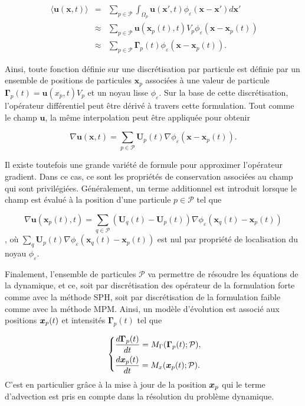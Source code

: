 \begin{eqnarray*}~\label{eq:part_approx}
    \langle \bm{u}(\bm{x}, t) \rangle &=& \sum_{p \in \mathcal P} \int_{\Omega_p} \bm{u}(\bm{x}', t) \phi_\varepsilon(\bm{x}-\bm{x}') d\bm{x}' \\
    &\approx& \sum_{p \in \mathcal P} \bm{u}(\bm{x}_p(t), t) V_p \phi_\varepsilon (\bm{x}-\bm{x}_p(t)) \\
    &\approx& \sum_{p \in \mathcal P} \bm{\Gamma}_p(t) \phi_\varepsilon (\bm{x}-\bm{x}_p(t)).
\end{eqnarray*}

Ainsi, toute fonction définie sur une discrétisation par particule est définie par un ensemble de positions de particules $\bm{x}_p$ associées à une valeur de particule $\bm{\Gamma}_p(t) = \bm{u}(x_p, t) V_p$ et un noyau lisse $\phi_\varepsilon$. Sur la base de cette discrétisation, l'opérateur différentiel peut être dérivé à travers cette formulation. Tout comme le champ $\bm u$, la même interpolation peut être appliquée pour obtenir

\begin{equation*}
    \nabla \bm{u}(\bm{x}, t) = \sum_{p \in \mathcal P} \bm{U}_p(t) \nabla \phi_\varepsilon (\bm{x}-\bm{x}_p(t)).
\end{equation*}

Il existe toutefois une grande variété de formule pour approximer l'opérateur gradient. Dans ce cas, ce sont les propriétés de conservation associées au champ qui sont privilégiées.
Généralement, un terme additionnel est introduit lorsque le champ est évalué à la position d'une particule $p \in \mathcal P$ tel que

\begin{equation*}
    \nabla \bm{u}(\bm{x}_p(t), t) = \sum_{q \in \mathcal P} (\bm{U}_q(t) - \bm{U}_p(t)) \nabla \phi_\varepsilon (\bm{x}_q(t)-\bm{x}_p(t))
\end{equation*}, où $\sum_q \bm{U}_p(t) \nabla \phi_\varepsilon (\bm{x}_q(t)-\bm{x}_p(t))$ est nul par propriété de localisation du noyau $\phi_\varepsilon$.

Finalement, l'ensemble de particules $\mathcal P$ va permettre de résoudre les équations de la dynamique, et ce, soit par discrétisation des opérateur de la formulation forte comme avec la méthode SPH, soit par discrétisation de la formulation faible comme avec la méthode MPM. Ainsi, un modèle d'évolution est associé aux positions $\bm{x}_p(t)$ et intensités $\bm \Gamma_p(t)$ tel que

\begin{gather}~\label{eq:model_evol}
    \left\{\begin{aligned}
         & \frac{d\bm \Gamma_p(t)}{dt} = M_\Gamma(\bm \Gamma_p(t); \mathcal P), \\
         & \frac{d \bm{x}_p(t)}{d t} = M_x(\bm{x}_p(t); \mathcal P).
    \end{aligned} \right.
\end{gather}C'est en particulier grâce à la mise à jour de la position $\bm{x}_p$ qui le terme d'advection est pris en compte dans la résolution du problème dynamique.

